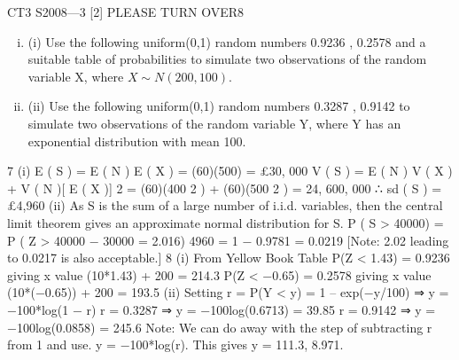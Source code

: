 \documentclass[a4paper,12pt]{article}
\begin{document}
CT3 S2008—3
[2]
PLEASE TURN OVER8
\begin{enumerate}[(i)]
\item (i)
Use the following uniform(0,1) random numbers
0.9236 , 0.2578
and a suitable table of probabilities to simulate two observations of the random
variable X, where $X \sim N(200,100)$.
\item (ii)
Use the following uniform(0,1) random numbers
0.3287 , 0.9142
to simulate two observations of the random variable Y, where Y has an exponential distribution with mean 100.
\end{enumerate}

7
(i)
E ( S ) = E ( N ) E ( X ) = (60)(500) = £30, 000
V ( S ) = E ( N ) V ( X ) + V ( N )[ E ( X )] 2
= (60)(400 2 ) + (60)(500 2 ) = 24, 600, 000 ∴ sd ( S ) = £4,960
(ii)
As S is the sum of a large number of i.i.d. variables, then the central limit
theorem gives an approximate normal distribution for S.
P ( S > 40000) = P ( Z >
40000 − 30000
= 2.016)
4960
= 1 − 0.9781 = 0.0219
[Note: 2.02 leading to 0.0217 is also acceptable.]
8
(i)
From Yellow Book Table
P(Z < 1.43) = 0.9236 giving x value (10*1.43) + 200 = 214.3
P(Z < −0.65) = 0.2578 giving x value (10*(−0.65)) + 200 = 193.5
(ii)
Setting r = P(Y < y) = 1 – exp(−y/100) ⇒ y = −100*log(1 − r)
r = 0.3287 ⇒ y = −100log(0.6713) = 39.85
r = 0.9142 ⇒ y = −100log(0.0858) = 245.6
Note: We can do away with the step of subtracting r from 1 and use.
y = −100*log(r). This gives y = 111.3, 8.971.
\end{document}
